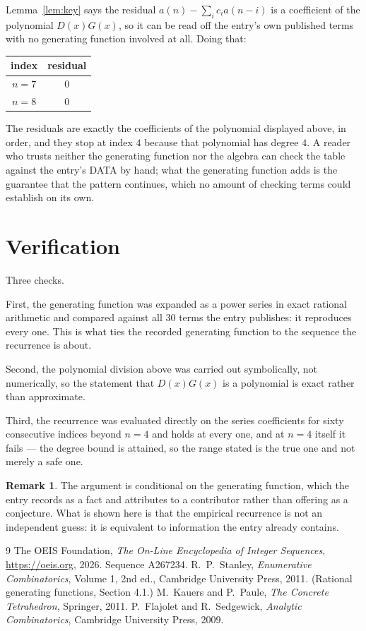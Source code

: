 \documentclass[11pt,a4paper]{article}
\theoremstyle{plain}
\theoremstyle{definition}
\newtheorem{remark}[theorem]{Remark}
\begin{document}
Lemma~\ref{lem:key} says the residual $a(n)-\sum_ic_ia(n-i)$ is a coefficient of the
polynomial $D(x)G(x)$, so it can be read off the entry's own published terms with no
generating function involved at all. Doing that:
\begin{center}
\begin{tabular}{cc}
index & residual \\ \hline
$n=7$ & $0$ \\
$n=8$ & $0$
\end{tabular}
\end{center}
The residuals are exactly the coefficients of the polynomial displayed above, in order, and
they stop at index $4$ because that polynomial has degree $4$. A reader who trusts
neither the generating function nor the algebra can check the table against the entry's DATA
by hand; what the generating function adds is the guarantee that the pattern continues, which
no amount of checking terms could establish on its own.

\section{Verification}

Three checks.

First, the generating function was expanded as a power series in exact rational arithmetic and
compared against all $30$ terms the entry publishes: it reproduces every one. This is
what ties the recorded generating function to the sequence the recurrence is about.

Second, the polynomial division above was carried out symbolically, not numerically, so the
statement that $D(x)G(x)$ is a polynomial is exact rather than approximate.

Third, the recurrence was evaluated directly on the series coefficients for sixty consecutive
indices beyond $n=4$ and holds at every one, and at $n=4$ itself it fails --- the
degree bound is attained, so the range stated is the true one and not merely a safe one.

\begin{remark}
The argument is conditional on the generating function, which the entry records as a fact and
attributes to a contributor rather than offering as a conjecture. What is shown here is that
the empirical recurrence is not an independent guess: it is equivalent to information the
entry already contains.
\end{remark}

\begin{thebibliography}{9}
 The OEIS Foundation, \emph{The On-Line Encyclopedia of Integer
Sequences}, \url{https://oeis.org}, 2026. Sequence A267234.
 R.~P.~Stanley, \emph{Enumerative Combinatorics}, Volume 1, 2nd ed.,
Cambridge University Press, 2011. (Rational generating functions, Section 4.1.)
 M.~Kauers and P.~Paule, \emph{The Concrete Tetrahedron}, Springer, 2011.
 P.~Flajolet and R.~Sedgewick, \emph{Analytic Combinatorics}, Cambridge
University Press, 2009.
\end{thebibliography}
\end{document}

